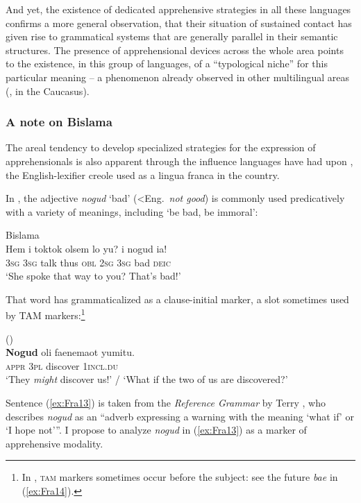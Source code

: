 \documentclass[output=paper,colorlinks,citecolor=brown]{langscibook}
\begin{document}
And yet, the existence of dedicated apprehensive strategies in all these languages confirms a more general observation, that their situation of sustained contact has given rise to grammatical systems that are generally parallel in their semantic structures. The presence of apprehensional devices across the whole area points to the existence, in this group of languages, of a ``typological niche'' for this particular meaning -- a phenomenon already observed in other multilingual areas (\citealt{chapters/daniel}, in the Caucasus). 



\subsubsection{A note on Bislama}
\label{subsubsec:bislama}

The areal tendency to develop specialized strategies for the expression of apprehensionals is also apparent through the influence  languages have had upon , the English-lexifier creole used as a lingua franca in the country. 

In , the adjective \textit{nogud} `bad' (<Eng.\ \textit{not good}) is commonly used predicatively with a variety of meanings, including `be bad, be immoral':
 
\ea \label{ex:Fra12} \textnormal{Bislama} \\
\gll Hem i toktok olsem lo yu? i nogud ia! \\
\textsc{3sg} \textsc{3sg} talk thus \textsc{obl} \textsc{2sg} \textsc{3sg} bad \textsc{deic} \\
\glt `She spoke that way to you? That's bad!'
\z

\noindent That word has grammaticalized as a clause-initial marker, a slot sometimes used by TAM markers:\footnote{In , \textsc{tam} markers sometimes occur before the subject: see the future \textit{bae} in (\ref{ex:Fra14}).} 

\ea \label{ex:Fra13} \textnormal{ (\citealt[186]{Crowley2004})} \\
\gll \textbf{Nogud}  oli  faenemaot  yumitu. \\
\textsc{appr} \textsc{3pl} discover \textsc{1incl.du} \\
\glt `They \textit{might} discover us!' / `What if the two of us are discovered?' 
\z

\noindent Sentence (\ref{ex:Fra13}) is taken from the \textit{ Reference Grammar} by Terry \citet{Crowley2004}, who describes \textit{nogud} as an ``adverb expressing a warning with the meaning `what if' or `I hope not'\textnormal{''}. I propose to analyze \textit{nogud} in (\ref{ex:Fra13}) as a marker of apprehensive modality.
\end{document}
